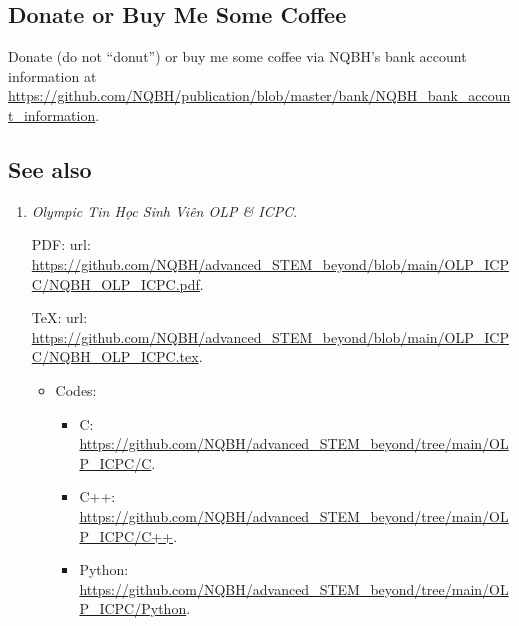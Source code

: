 \documentclass{article}
\begin{document}
\subsection{Donate or Buy Me Some Coffee}
Donate (do not ``donut'') or buy me some coffee via NQBH's bank account information at \url{https://github.com/NQBH/publication/blob/master/bank/NQBH_bank_account_information}.

\subsection{See also}

\begin{enumerate}
	\item {\it Olympic Tin Học Sinh Viên OLP \& ICPC}.
	
	PDF: {\sc url}: \url{https://github.com/NQBH/advanced_STEM_beyond/blob/main/OLP_ICPC/NQBH_OLP_ICPC.pdf}.
	
	\TeX: {\sc url}: \url{https://github.com/NQBH/advanced_STEM_beyond/blob/main/OLP_ICPC/NQBH_OLP_ICPC.tex}.
	\begin{itemize}
		\item Codes:
		\begin{itemize}
			\item C: \url{https://github.com/NQBH/advanced_STEM_beyond/tree/main/OLP_ICPC/C}.
			\item C++: \url{https://github.com/NQBH/advanced_STEM_beyond/tree/main/OLP_ICPC/C++}.
			\item Python: \url{https://github.com/NQBH/advanced_STEM_beyond/tree/main/OLP_ICPC/Python}.
		\end{itemize}
	\end{itemize}
\end{enumerate}


\printbibliography[heading=bibintoc]
	
\end{document}
